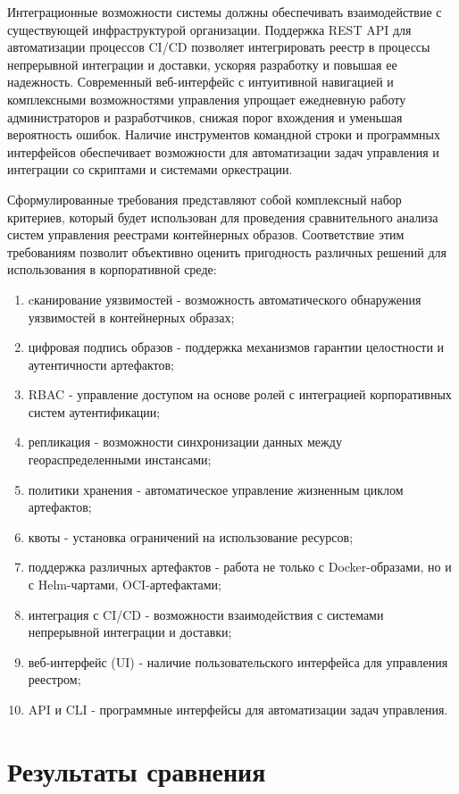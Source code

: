 Интеграционные возможности системы должны обеспечивать взаимодействие с существующей инфраструктурой организации. Поддержка REST API для автоматизации процессов CI/CD позволяет интегрировать реестр в процессы непрерывной интеграции и доставки, ускоряя разработку и повышая ее надежность. Современный веб-интерфейс с интуитивной навигацией и комплексными возможностями управления упрощает ежедневную работу администраторов и разработчиков, снижая порог вхождения и уменьшая вероятность ошибок. Наличие инструментов командной строки и программных интерфейсов обеспечивает возможности для автоматизации задач управления и интеграции со скриптами и системами оркестрации.

Сформулированные требования представляют собой комплексный набор критериев, который будет использован для проведения сравнительного анализа систем управления реестрами контейнерных образов. Соответствие этим требованиям позволит объективно оценить пригодность различных решений для использования в корпоративной среде:

\begin{enumerate}
	\item cканирование уязвимостей - возможность автоматического обнаружения уязвимостей в контейнерных образах;
	\item цифровая подпись образов - поддержка механизмов гарантии целостности и аутентичности артефактов;
	\item RBAC - управление доступом на основе ролей с интеграцией корпоративных систем аутентификации;
	\item репликация - возможности синхронизации данных между геораспределенными инстансами;
	\item политики хранения - автоматическое управление жизненным циклом артефактов;
	\item квоты - установка ограничений на использование ресурсов;
	\item поддержка различных артефактов - работа не только с Docker-образами, но и с Helm-чартами, OCI-артефактами;
	\item интеграция с CI/CD - возможности взаимодействия с системами непрерывной интеграции и доставки;
	\item веб-интерфейс (UI) - наличие пользовательского интерфейса для управления реестром;
	\item API и CLI - программные интерфейсы для автоматизации задач управления.
\end{enumerate}

\section{Результаты сравнения}

